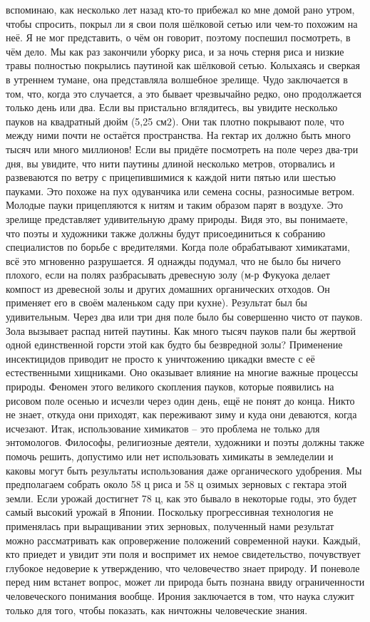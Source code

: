 \documentclass[a4paper]{book}
\begin{document}
вспоминаю, как несколько лет назад кто-то прибежал ко мне домой рано утром, чтобы
спросить, покрыл ли я свои поля шёлковой сетью или чем-то похожим на неё. Я не мог
представить, о чём он говорит, поэтому поспешил посмотреть, в чём дело.
Мы как раз закончили уборку риса, и за ночь стерня риса и низкие травы полностью
покрылись паутиной как шёлковой сетью. Колыхаясь и сверкая в утреннем тумане, она
представляла волшебное зрелище. Чудо заключается в том, что, когда это случается, а это
бывает чрезвычайно редко, оно продолжается только день или два. Если вы пристально
вглядитесь, вы увидите несколько пауков на квадратный дюйм (5,25 см2). Они так плотно
покрывают поле, что между ними почти не остаётся пространства. На гектар их должно
быть много тысяч или много миллионов! Если вы придёте посмотреть на поле через два-три
дня, вы увидите, что нити паутины длиной несколько метров, оторвались и развеваются по
ветру с прицепившимися к каждой нити пятью или шестью пауками. Это похоже на пух
одуванчика или семена сосны, разносимые ветром. Молодые пауки прицепляются к нитям и
таким образом парят в воздухе.
Это зрелище представляет удивительную драму природы. Видя это, вы понимаете, что
поэты и художники также должны будут присоединиться к собранию специалистов по
борьбе с вредителями.
Когда поле обрабатывают химикатами, всё это мгновенно разрушается. Я однажды
подумал, что не было бы ничего плохого, если на полях разбрасывать древесную золу (м-р
Фукуока делает компост из древесной золы и других домашних органических отходов. Он
применяет его в своём маленьком саду при кухне). Результат был бы удивительным. Через
два или три дня поле было бы совершенно чисто от пауков. Зола вызывает распад нитей
паутины. Как много тысяч пауков пали бы жертвой одной единственной горсти этой как
будто бы безвредной золы? Применение инсектицидов приводит не просто к уничтожению
цикадки вместе с её естественными хищниками. Оно оказывает влияние на многие важные
процессы природы.
Феномен этого великого скопления пауков, которые появились на рисовом поле осенью
и исчезли через один день, ещё не понят до конца. Никто не знает, откуда они приходят, как
переживают зиму и куда они деваются, когда исчезают.
Итак, использование химикатов – это проблема не только для энтомологов. Философы,
религиозные деятели, художники и поэты должны также помочь решить, допустимо или нет
использовать химикаты в земледелии и каковы могут быть результаты использования даже
органического удобрения.
Мы предполагаем собрать около 58 ц риса и 58 ц озимых зерновых с гектара этой земли.
Если урожай достигнет 78 ц, как это бывало в некоторые годы, это будет самый высокий
урожай в Японии. Поскольку прогрессивная технология не применялась при выращивании
этих зерновых, полученный нами результат можно рассматривать как опровержение
положений современной науки. Каждый, кто приедет и увидит эти поля и воспримет их
немое свидетельство, почувствует глубокое недоверие к утверждению, что человечество
знает природу. И поневоле перед ним встанет вопрос, может ли природа быть познана ввиду
ограниченности человеческого понимания вообще.
Ирония заключается в том, что наука служит только для того, чтобы показать, как
ничтожны человеческие знания.
\end{document}

